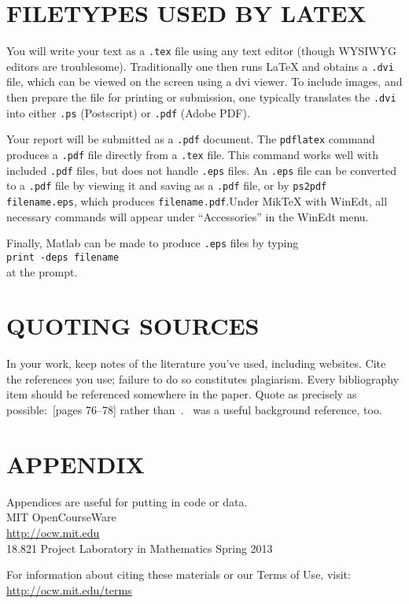 \documentclass[leqno]{article}
\begin{document}
	\section{FILETYPES USED BY LATEX}
	\hspace{0.5 cm}You will write your text as a \texttt{.tex} file using any text editor (though WYSIWYG editors are troublesome). Traditionally one then runs \LaTeX{} and obtains a \texttt{.dvi} file, which can be viewed on the screen using a dvi viewer. To include images, and then prepare the file for printing or submission, one typically translates the \texttt{.dvi} into either \texttt{.ps} (Postscript) or \texttt{.pdf} (Adobe PDF).
	\par{}\hspace{0.5 cm}Your report will be submitted as a \texttt{.pdf} document. The \texttt{pdflatex} command produces a \texttt{.pdf} file directly from a \texttt{.tex} file. This command works well with included \texttt{.pdf} files, but does not handle \texttt{.eps} files. An \texttt{.eps} file can be converted to a \texttt{.pdf} file by viewing it and saving as a \texttt{.pdf} file, or by \texttt{ps2pdf filename.eps}, which produces \texttt{filename.pdf}.Under MikTeX with WinEdt, all necessary commands will appear under “Accessories” in the WinEdt menu.
	\par{}\hspace{0.5 cm} Finally, Matlab can be made to produce \texttt{.eps} files by typing\\
	\hspace{3 cm} \texttt{print -deps filename}\\ at the prompt.
	\section{QUOTING SOURCES}
	\hspace{0.5 cm}In your work, keep notes of the literature you’ve used, including websites. Cite the references you use; failure to do so constitutes plagiarism. Every bibliography item should be referenced somewhere in the paper. Quote as precisely as possible:~\cite{ref1}[pages 76--78] rather than~\cite{ref1}.~\cite{ref2} was a useful background reference, too.
  
  \cite{gurps2008,burps2008}
  
  
  
	\appendix
	\section*{APPENDIX}
	Appendices are useful for putting in code or data.\\ 
	\newpage
	MIT OpenCourseWare\\
	\href{http://ocw.mit.edu}{\underline{http://ocw.mit.edu}}\\
	\vspace{2 cm}
	18.821 Project Laboratory in Mathematics
	\newline
	Spring 2013

	\vspace{2 cm}
	For information about citing these materials or our Terms of Use, visit: 
	\href{http://ocw.mit.edu/terms}{\underline{http://ocw.mit.edu/terms}}
\end{document}
